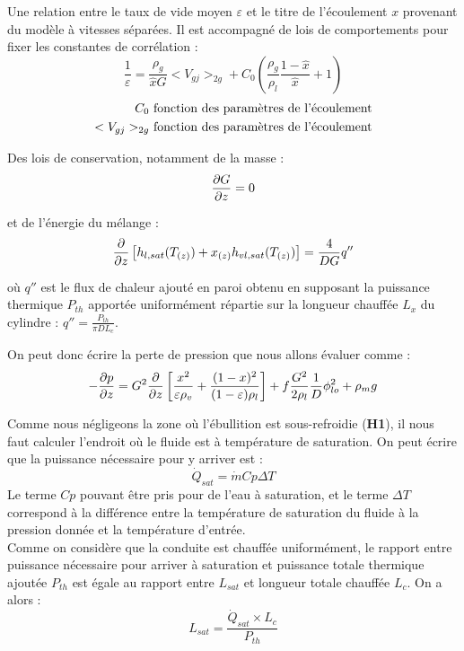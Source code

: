 Une relation entre le taux de vide moyen $\varepsilon$ et le titre de l'écoulement $x$ provenant du modèle à vitesses séparées. Il est accompagné de lois de comportements pour fixer les constantes de corrélation :
\begin{equation}
        \frac{1}{\varepsilon} = \frac{\rho_g}{\hat{x} G} <V_{gj}>_{2g} + C_0\left(\frac{\rho_g}{\rho_l}\frac{1-\hat{x}}{\hat{x}} + 1\right) 
\end{equation}
\begin{align*}
         C_0 &\textnormal{ fonction des paramètres de l'écoulement}\\
        <V_{gj}>_{2g} &\textnormal{ fonction des paramètres de l'écoulement}   
\end{align*}

Des lois de conservation, notamment de la masse :
\begin{equation}
    \pder[G]{z} = 0
\end{equation}

et de l'énergie du mélange :
\begin{equation}
    \pder{z} \left[ h_{l,sat}(T_{(z)})+x_{(z)}h_{vl,sat}(T_{(z)})\right] = \frac{4}{DG}q''
\end{equation}

où $q''$ est le flux de chaleur ajouté en paroi obtenu en supposant la puissance thermique $P_{th}$ apportée uniformément répartie sur la longueur chauffée $L_x$ du cylindre : $q'' = \frac{P_{th}}{\pi DL_c}$.\\ \par
On peut donc écrire la perte de pression que nous allons évaluer comme :
\begin{equation}
     -\pder[p]{z} = G^2\pder{z}\left[\frac{x^{2}}{\varepsilon \rho_{v}}+\frac{(1-x)^{2}}{(1-\varepsilon) \rho_{l}} \right] + f\frac{G^2}{2 \rho_l}\frac{1}{D} \phi_{lo}^2 + \rho_m g
\end{equation}

Comme nous négligeons la zone où l'ébullition est sous-refroidie (\textbf{H1}), il nous faut calculer l'endroit où le fluide est à température de saturation. On peut écrire que la puissance nécessaire pour y arriver est :
\begin{equation}
    \dot{Q}_{sat} = \dot{m} Cp \Delta T
\end{equation}
Le terme $Cp$ pouvant être pris pour de l'eau à saturation, et le terme $\Delta T$ correspond à la différence entre la température de saturation du fluide à la pression donnée et la température d'entrée.\\ 
Comme on considère que la conduite est chauffée uniformément, le rapport entre puissance nécessaire pour arriver à saturation et puissance totale thermique ajoutée $P_{th}$ est égale au rapport entre $L_{sat}$ et longueur totale chauffée $L_c$. On a alors :
\begin{equation}
    L_{sat}= \frac{ \dot{Q}_{sat}\times L_c}{P_{th}}
\end{equation}